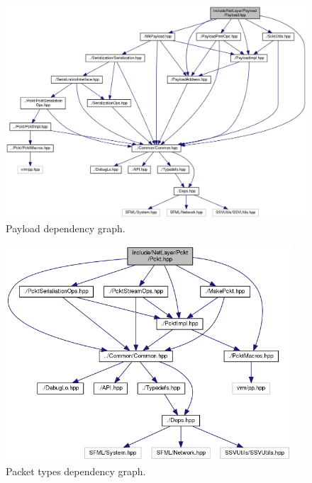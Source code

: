 \documentclass[12pt]{report}
\newcommand{\+}{\discretionary{\mbox{\scriptsize$\hookleftarrow$}}{}{}}
\begin{document}
\begin{figure}[!htb]
\caption{Payload dependency graph.}
\centering
\includegraphics[width=1\textwidth]{inc/dep_paylod.png}
\end{figure}

\begin{figure}[!htb]
\caption{Packet types dependency graph.}
\centering
\includegraphics[width=0.95\textwidth]{inc/dep_pckt.png}
\end{figure}
\end{document}
